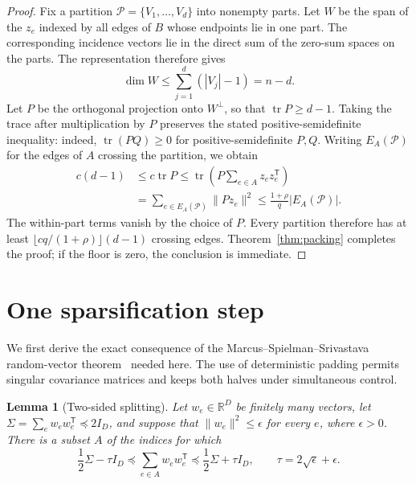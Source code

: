 \documentclass[11pt]{amsart}
\newtheorem{lemma}[theorem]{Lemma}
\theoremstyle{definition}
\theoremstyle{remark}
\numberwithin{equation}{section}
\begin{document}
\begin{proof}
Fix a partition $\mathcal P=\{V_1,\ldots,V_d\}$ into nonempty parts.
Let $W$ be the span of the $z_e$ indexed by all edges of $B$ whose
endpoints lie in one part.  The corresponding incidence vectors lie in
the direct sum of the zero-sum spaces on the parts.  The representation
therefore gives
\[
 \dim W\leq\sum_{j=1}^d(|V_j|-1)=n-d.
\]
Let $P$ be the orthogonal projection onto $W^\perp$, so that
$\operatorname{tr}P\geq d-1$.  Taking the trace after multiplication by
$P$ preserves the stated positive-semidefinite inequality: indeed,
$\operatorname{tr}(PQ)\geq0$ for positive-semidefinite $P,Q$.
Writing $E_A(\mathcal P)$ for the edges of $A$ crossing the partition,
we obtain
\begin{align*}
 c(d-1)
 &\leq c\operatorname{tr}P
 \leq\operatorname{tr}\left(P\sum_{e\in A}z_ez_e^{\mathsf T}\right)\\
 &=\sum_{e\in E_A(\mathcal P)}\|Pz_e\|^2
 \leq\frac{1+\rho}{q}|E_A(\mathcal P)|.
\end{align*}
The within-part terms vanish by the choice of $P$.  Every partition
therefore has at least $\lfloor cq/(1+\rho)\rfloor(d-1)$ crossing
edges.  Theorem~\ref{thm:packing} completes the proof; if the floor is
zero, the conclusion is immediate.
\end{proof}

\section{One sparsification step}
\label{sec:sparsification}

We first derive the exact consequence of the Marcus--Spielman--Srivastava
random-vector theorem~\cite[Theorem~1.4]{MSS}
needed here.  The use of deterministic padding permits singular
covariance matrices and keeps both halves under simultaneous control.

\begin{lemma}[Two-sided splitting]
\label{lemma:two-system-split}
Let $w_e\in\mathbb R^D$ be finitely many vectors, let
$\Sigma=\sum_e w_ew_e^{\mathsf T}\preceq2I_D$, and suppose that
$\|w_e\|^2\leq\epsilon$ for every $e$, where $\epsilon>0$.
There is a subset $A$ of the indices for which
\begin{equation}
 \frac12\Sigma-\tau I_D
 \preceq\sum_{e\in A}w_ew_e^{\mathsf T}
 \preceq\frac12\Sigma+\tau I_D,
 \qquad \tau=2\sqrt\epsilon+\epsilon.
 \label{eq:two-sided-split}
\end{equation}
\end{lemma}
\end{document}
